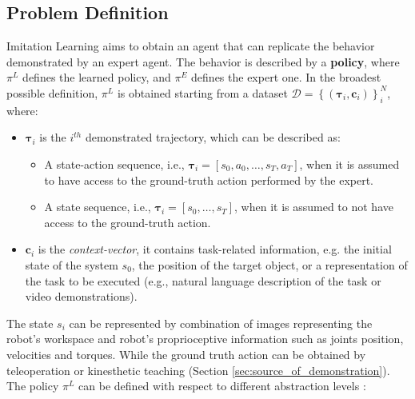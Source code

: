 \subsection{Problem Definition}
\label{sec:problem_formulation}
Imitation Learning aims to obtain an agent that can replicate the behavior demonstrated by an expert agent. The behavior is described by a \textbf{policy}, where $\pi^{L}$ defines the learned policy, and $\pi^{E}$ defines the expert one. In the broadest possible definition, $\pi^{L}$ is obtained starting from a dataset $\mathcal{D}=\left \{ \left ( \boldsymbol{\tau}_{i}, \boldsymbol{c}_{i}\right ) \right \}_{i}^{N}$, where:
\begin{itemize}
    \item $\boldsymbol{\tau}_{i}$ is the $i^{th}$ demonstrated trajectory, which can be described as:
          \begin{itemize}
              \item A state-action sequence, i.e., $\boldsymbol{\tau}_{i} = [s_{0}, a_{0}, \dots, s_{T}, a_{T}]$, when it is assumed to have access to the ground-truth action performed by the expert.
              \item A state sequence, i.e., $\boldsymbol{\tau}_{i} = [s_{0}, \dots, s_{T}]$, when it is assumed to not have access to the ground-truth action.
          \end{itemize}
    \item $\boldsymbol{c}_{i}$ is the \textit{context-vector}, it contains task-related information, e.g. the initial state of the system $s_{0}$, the position of the target object, or a representation of the task to be executed (e.g., natural language description of the task or video demonstrations).
\end{itemize}
The state $s_{i}$ can be represented by combination of images representing the robot's workspace and robot's proprioceptive information such as joints position, velocities and torques. While the ground truth action can be obtained by teleoperation or kinesthetic teaching (Section \ref{sec:source_of_demonstration}).
\newline The policy $\pi^{L}$ can be defined with respect to different abstraction levels \cite{fang2019survey,osa2018algorithmic}:

